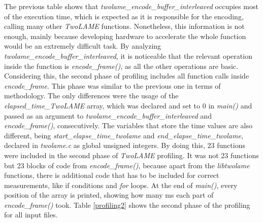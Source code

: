 The previous table shows that \textit{twolame\_encode\_buffer\_interleaved} occupies most of the execution time, which is expected as it is responsible for the encoding, calling many other \textit{TwoLAME} functions. Nonetheless, this information is not enough, mainly because developing hardware to accelerate the whole function would be an extremely difficult task.
By analyzing \textit{twolame\_encode\_buffer\_interleaved}, it is noticeable that the relevant operation inside the function is \textit{encode\_frame()}, as all the other operations are basic.
Considering this, the second phase of profiling includes all function calls inside \textit{encode\_frame}. 
This phase was similar to the previous one in terms of methodology. The only differences were the usage of the \textit{elapsed\_time\_\textit{TwoLAME}} array, which was declared and set to 0 in \textit{main()} and passed as an argument to \textit{twolame\_encode\_buffer\_interleaved} and \textit{encode\_frame()}, consecutively. The variables that store the time values are also different, being \textit{start\_elapse\_time\_twolame} and \textit{end\_elapse\_time\_twolame}, declared in \textit{twolame.c} as global unsigned integers.
By doing this, 23 functions were included in the second phase of \textit{TwoLAME} profiling. It was not 23 functions but 23 blocks of code from \textit{encode\_frame()}, because apart from the \textit{libtwolame} functions, there is additional code that has to be included for correct measurements, like if conditions and \textit{for} loops.
At the end of \textit{main()}, every position of the array is printed, showing how many ms each part of \textit{encode\_frame()} took. 
Table \ref{profiling2} shows the second phase of the profiling for all input files.

